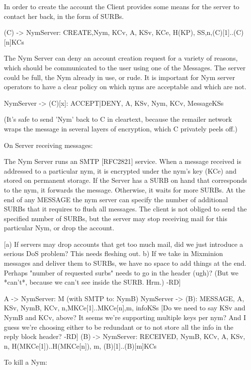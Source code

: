 In order to create the account the Client provides some means for the
server to contact her back, in the form of SURBs.

(C) -> NymServer: {CREATE,Nym, KCv, A, KSv, KCe, H(KP), SS,n,(C)[1]..(C)[n]}KCs

The Nym Server can deny an account creation request for a variety of
reasons, which should be communicated to the user using one of the
Messages. The server could be full, the Nym already in use, or rude.
It is important for Nym server operators to have a clear policy on
which nyms are acceptable and which are not.

NymServer -> (C)[x]: {ACCEPT|DENY, A, KSv, Nym, KCv, Message}KSs

(It's safe to send 'Nym' back to C in cleartext, because the remailer
network wraps the message in several layers of encryption, which C
privately peels off.)

On Server receiving messages:

The Nym Server runs an SMTP [RFC2821] service. When a message received
is addressed to a particular nym, it is encrypted under the nym's key
(KCe) and stored on permanent storage. If the Server has a SURB on
hand that corresponds to the nym, it forwards the message. Otherwise,
it waits for more SURBs. At the end of any MESSAGE the nym server can
specify the number of additional SURBs that it requires to flush all
messages. The client is not obliged to send the specified number of
SURBs, but the server may stop receiving mail for this particular Nym,
or drop the account.

[a) If servers may drop accounts that get too much mail, did we just
 introduce a serious DoS problem? This needs fleshing out.
 b) If we take in Mixminion messages and deliver them to SURBs, we have
 no space to add things at the end. Perhaps "number of requested surbs"
 needs to go in the header (ugh)? (But we *can't*, because we can't see
 inside the SURB. Hrm.) -RD]

A -> NymServer: M (with SMTP to: NymB)
NymServer -> (B): {MESSAGE, A, KSv, NymB, KCv,
                   n,{M}KCe[1]..{M}KCe[n],m, info}KSs
[Do we need to say KSv and NymB and KCv, above? It seems we're supporting
multiple keys per nym? And I guess we're choosing either to be redundant
or to not store all the info in the reply block header? -RD]
(B) -> NymServer: {RECEIVED,  NymB, KCv, A, KSv, n,
                   H({M}KCe[1])..H({M}KCe[n]), m, (B)[1]..(B)[m]}KCs

To kill a Nym:

